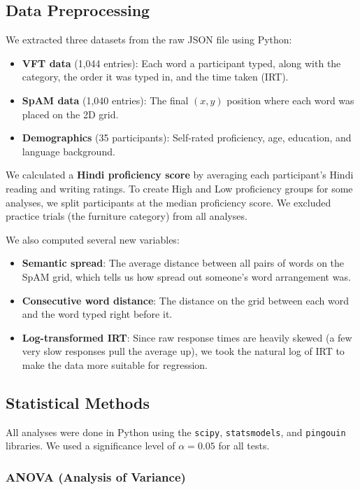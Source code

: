 \documentclass[12pt, a4paper]{article}
\begin{document}
\subsection{Data Preprocessing}

We extracted three datasets from the raw JSON file using Python:
\begin{itemize}[nosep]
    \item \textbf{VFT data} (1,044 entries): Each word a participant typed, along with the category, the order it was typed in, and the time taken (IRT).
    \item \textbf{SpAM data} (1,040 entries): The final $(x, y)$ position where each word was placed on the 2D grid.
    \item \textbf{Demographics} (35 participants): Self-rated proficiency, age, education, and language background.
\end{itemize}

We calculated a \textbf{Hindi proficiency score} by averaging each participant's Hindi reading and writing ratings. To create High and Low proficiency groups for some analyses, we split participants at the median proficiency score. We excluded practice trials (the furniture category) from all analyses.

We also computed several new variables:
\begin{itemize}[nosep]
    \item \textbf{Semantic spread}: The average distance between all pairs of words on the SpAM grid, which tells us how spread out someone's word arrangement was.
    \item \textbf{Consecutive word distance}: The distance on the grid between each word and the word typed right before it.
    \item \textbf{Log-transformed IRT}: Since raw response times are heavily skewed (a few very slow responses pull the average up), we took the natural log of IRT to make the data more suitable for regression.
\end{itemize}

\subsection{Statistical Methods}

All analyses were done in Python using the \texttt{scipy}, \texttt{statsmodels}, and \texttt{pingouin} libraries. We used a significance level of $\alpha = 0.05$ for all tests.

\subsubsection{ANOVA (Analysis of Variance)}
\end{document}
